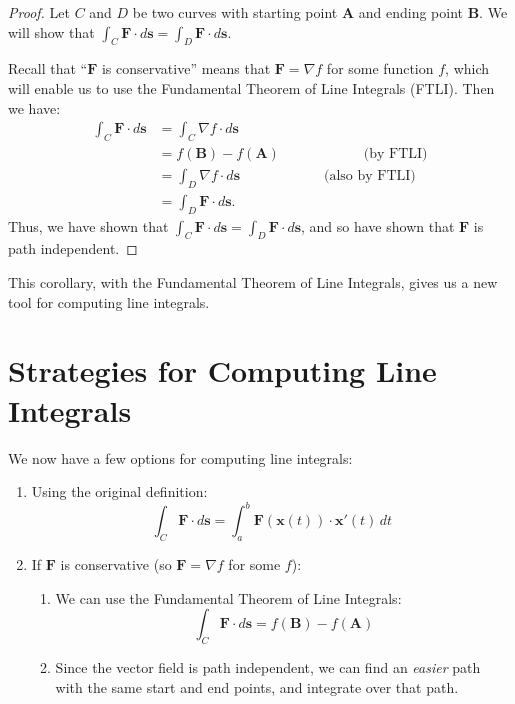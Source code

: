 \documentclass{ximera}
\begin{document}
\begin{proof}
Let $C$ and $D$ be two curves with starting point $\textbf{A}$ and ending point $\textbf{B}$. We will show that $\int_C\textbf{F}\cdot d\textbf{s}=\int_D\textbf{F}\cdot d\textbf{s}$.

Recall that ``$\textbf{F}$ is conservative'' means that $\textbf{F}=\nabla f$ for some function $f$, which will enable us to use the Fundamental Theorem of Line Integrals (FTLI). Then we have:
\begin{align*}
\int_C\textbf{F}\cdot d\textbf{s} &= \int_C\nabla f\cdot d\textbf{s}\\
&= f(\textbf{B})-f(\textbf{A})\hspace{1in}\textrm{(by FTLI)}\\
&= \int_D\nabla f\cdot d\textbf{s}\hspace{1in}\textrm{(also by FTLI)}\\
&= \int_D\textbf{F}\cdot d\textbf{s}.
\end{align*}
Thus, we have shown that $\int_C\textbf{F}\cdot d\textbf{s}=\int_D\textbf{F}\cdot d\textbf{s}$, and so have shown that $\textbf{F}$ is path independent.
\end{proof}

This corollary, with the Fundamental Theorem of Line Integrals, gives us a new tool for computing line integrals.

\section{Strategies for Computing Line Integrals}

We now have a few options for computing line integrals:

\begin{enumerate}
\item Using the original definition:
\[
\int_C\textbf{F}\cdot d\textbf{s} = \int_a^b\textbf{F}(\textbf{x}(t))\cdot \textbf{x}'(t)\,dt
\]
\item If $\textbf{F}$ is conservative (so $\textbf{F}=\nabla f$ for some $f$):
\begin{enumerate}
\item We can use the Fundamental Theorem of Line Integrals: 
\[
\int_C\textbf{F}\cdot d\textbf{s} = f(\textbf{B})-f(\textbf{A})
\]
\item Since the vector field is path independent, we can find an \emph{easier} path with the same start and end points, and integrate over that path.
\end{enumerate}
\end{enumerate}
\end{document}
